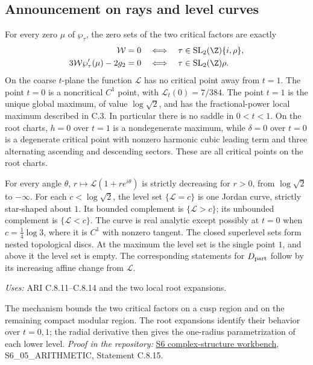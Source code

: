 \subsection{Announcement on rays and level curves}

\begin{announcement}\label{ari:C.8.15}
For every zero $\mu$ of $\wp_\tau$, the zero sets of the two
critical factors are exactly
\[
 \begin{aligned}
 \mathcal W=0&\quad\Longleftrightarrow\quad
       \tau\in\operatorname{SL}_2(\Z)\{i,\rho\},\\
 3\mathcal W\wp'_\tau(\mu)-2g_2=0&\quad\Longleftrightarrow\quad
       \tau\in\operatorname{SL}_2(\Z)\rho.
 \end{aligned}
\]
On the coarse $t$-plane the function $\mathcal L$ has no critical point
away from $t=1$. The point $t=0$ is a noncritical $C^1$ point,
with $\mathcal L_t(0)=7/384$. The point $t=1$ is the unique global
maximum, of value $\log\sqrt2$, and has the fractional-power
local maximum described in C.3. In particular there is no
saddle in $0<t<1$. On the root charts, $h=0$ over $t=1$
is a nondegenerate maximum, while $\delta=0$ over $t=0$
is a degenerate critical point with nonzero harmonic cubic
leading term and three alternating ascending and descending
sectors. These are all critical points on the root charts.

For every angle $\theta$, $r\mapsto \mathcal L(1+re^{i\theta})$ is
strictly decreasing for $r>0$, from $\log\sqrt2$ to $-\infty$.
For each $c<\log\sqrt2$, the level set $\{\mathcal L=c\}$ is one
Jordan curve, strictly star-shaped about $1$. Its bounded
complement is $\{\mathcal L>c\}$; its unbounded complement is
$\{\mathcal L<c\}$. The curve is real analytic except possibly at
$t=0$ when $c=\frac14\log3$, where it is $C^1$ with nonzero
tangent. The closed superlevel sets form nested topological
discs. At the maximum the level set is the single point $1$,
and above it the level set is empty. The corresponding
statements for $D_{\rm part}$ follow by its increasing affine
change from $\mathcal L$.
\end{announcement}
\noindent\textit{Uses:} ARI C.8.11--C.8.14 and the two local root expansions.\par
The mechanism bounds the two critical factors on a cusp region and on the remaining compact modular region. The root expansions identify their behavior over $t=0,1$; the radial derivative then gives the one-radius parametrization of each lower level.
\noindent\textit{Proof in the repository:} \href{https://github.com/KokunoYumeto/s6-complex-structure-workbench}{S6 complex-structure workbench}, S6\_05\_ARITHMETIC, Statement C.8.15.
